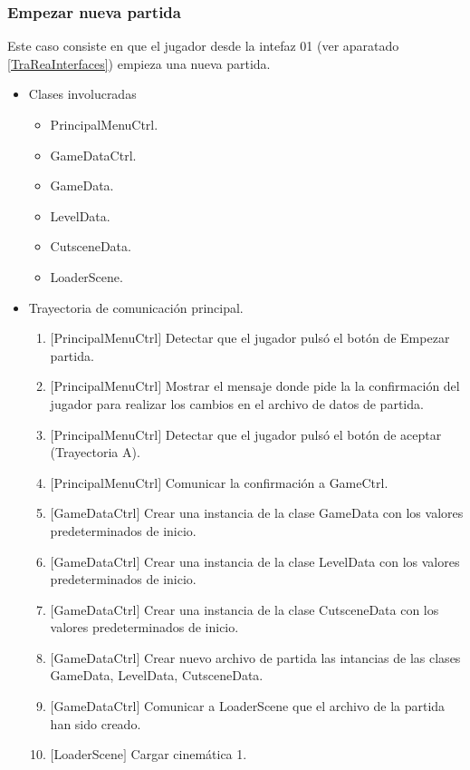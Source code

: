 	\subsubsection{Empezar nueva partida}
	Este caso consiste en que el jugador desde la intefaz 01 (ver aparatado
	  \ref{TraReaInterfaces}) empieza una nueva partida.  	
	\begin{itemize}
		\item Clases involucradas
			\begin{itemize}
				\item PrincipalMenuCtrl.
				\item GameDataCtrl.
				\item GameData.
				\item LevelData.
				\item CutsceneData.
				\item LoaderScene.
			\end{itemize}
			
		

\item Trayectoria de comunicación principal.
		\begin{enumerate}
				\item $\lbrack$PrincipalMenuCtrl$\rbrack$ Detectar que el jugador pulsó el 
				botón de Empezar partida.
				\item $\lbrack$PrincipalMenuCtrl$\rbrack$ Mostrar el mensaje donde pide la 
				la confirmación del jugador para realizar los cambios en el archivo de 
				datos de partida.
				\item $\lbrack$PrincipalMenuCtrl$\rbrack$ Detectar que el jugador pulsó el 
				botón de aceptar (Trayectoria A).
				\item $\lbrack$PrincipalMenuCtrl$\rbrack$ Comunicar la confirmación a GameCtrl.
				\item $\lbrack$GameDataCtrl$\rbrack$ Crear una instancia de la clase GameData 
				con los valores predeterminados de inicio.
				\item $\lbrack$GameDataCtrl$\rbrack$ Crear una instancia de la clase LevelData 
				con los valores predeterminados de inicio.
				\item $\lbrack$GameDataCtrl$\rbrack$ Crear una instancia de la clase CutsceneData 
				con los valores predeterminados de inicio.
				\item $\lbrack$GameDataCtrl$\rbrack$ Crear nuevo archivo de partida las 
				intancias de las clases GameData, LevelData, CutsceneData.
				\item $\lbrack$GameDataCtrl$\rbrack$ Comunicar a LoaderScene que el archivo 
				de la partida han sido creado.
				\item $\lbrack$LoaderScene$\rbrack$ Cargar cinemática 1.
		\end{enumerate}
		

\end{itemize}
